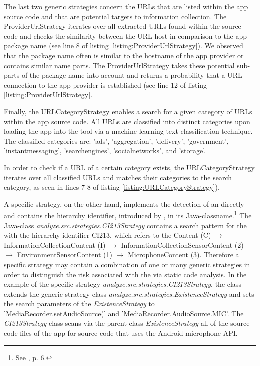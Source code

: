 The last two generic strategies concern the \acs{URL}s that are listed within the app source code and that are potential targets to information collection.
The ProviderUrlStrategy iterates over all extracted URLs found within the source code and checks the similarity between the URL host in comparison to the app package name (see line 8 of listing \ref{listing:ProviderUrlStrategy}).
We observed that the package name often is similar to the hostname of the app provider or contains similar name parts. 
The ProviderUrlStrategy takes these potential sub-parts of the package name into account and returns a probability that a URL connection to the app provider is established (see line 12 of listing \ref{listing:ProviderUrlStrategy}.


Finally, the URLCategoryStrategy enables a search for a given category of URLs within the app source code.
All URLs are classified into distinct categories upon loading the app into the \sca tool via a machine learning text classification technique.
The classified categories are: 'ads', 'aggregation', 'delivery', 'government', 'instantmessaging', 'searchengines', 'socialnetworks', and 'storage'.

In order to check if a URL of a certain category exists, the URLCategoryStrategy iterates over all classified URLs and matches their categories to the search category, as seen in lines 7-8 of listing \ref{listing:URLCategoryStrategy}).


A specific strategy, on the other hand, implements the detection of an \ipp directly and contains the \ipp hierarchy identifier, introduced by \textcite{Dehling2016}, in its Java-classname.\footnote{See \cite{Dehling2016}, p. 6.}
The Java-class \textit{analyze.src.strategies.CI213\textunderscore Strategy} contains a search pattern for the \ipp with the hierarchy identifier CI213, which refers to the \ipp Content (C) $\rightarrow$ InformationCollectionContent (I) $\rightarrow$ InformationCollectionSensorContent (2) $\rightarrow$ EnvironmentSensorContent (1) $\rightarrow$ MicrophoneContent (3).
Therefore a specific strategy may contain a combination of one or many generic strategies in order to distinguish the risk associated with the \ipp via static code analysis.
In the example of the specific strategy \textit{analyze.src.strategies.CI213\textunderscore Strategy}, the class extends the generic strategy class \textit{analyze.src.strategies.ExistenceStrategy} and sets the search parameters of the \textit{ExistenceStrategy} to 'MediaRecorder.setAudioSource(' and 'MediaRecorder.AudioSource.MIC'.
The \textit{CI213\textunderscore Strategy} class scans via the parent-class \textit{ExistenceStrategy} all of the source code files of the app for source code that uses the Android microphone \acs{API}.

